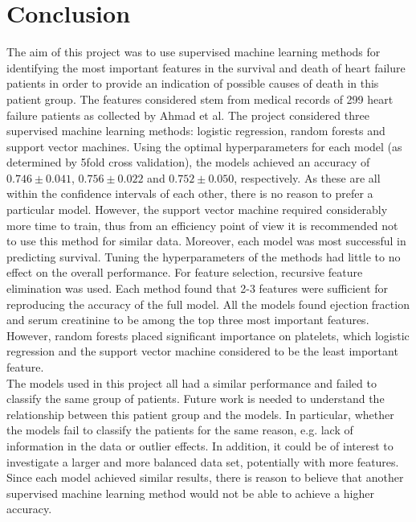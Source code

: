 \documentclass[notitlepage, reprint, nofootinbib]{revtex4-1}
\begin{document}
\section{Conclusion}
The aim of this project was to use supervised machine learning methods for identifying the most important features in the survival and death of heart failure patients in order to provide an indication of possible causes of death in this patient group. The features considered stem from medical records of 299 heart failure patients as collected by Ahmad et al. \cite{dataset_article} The project considered three supervised machine learning methods: logistic regression, random forests and support vector machines. Using the optimal hyperparameters for each model (as determined by 5fold cross validation), the models achieved an accuracy of $0.746\pm0.041$, $0.756\pm0.022$ and $0.752\pm0.050$, respectively. As these are all within the confidence intervals of each other, there is no reason to prefer a particular model. However, the support vector machine required considerably more time to train, thus from an efficiency point of view it is recommended not to use this method for similar data. Moreover, each model was most successful in predicting survival. Tuning the hyperparameters of the methods had little to no effect on the overall performance. For feature selection, recursive feature elimination was used. Each method found that 2-3 features were sufficient for reproducing the accuracy of the full model. All the models found ejection fraction and serum creatinine to be among the top three most important features. However, random forests placed significant importance on platelets, which logistic regression and the support vector machine considered to be the least important feature.  \\[2mm]
The models used in this project all had a similar performance and failed to classify the same group of patients. Future work is needed to understand the relationship between this patient group and the models. In particular, whether the models fail to classify the patients for the same reason, e.g. lack of information in the data or outlier effects. In addition, it could be of interest to investigate a larger and more balanced data set, potentially with more features. Since each model achieved similar results, there is reason to believe that another supervised machine learning method would not be able to achieve a higher accuracy.


\end{document}
